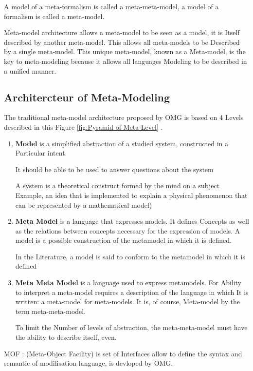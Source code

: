 A model of a meta-formalism is called a meta-meta-model, a model of a formalism is called a meta-model\cite{ch3-meta2}.

Meta-model architecture allows a meta-model to be seen as a model, it is
Itself described by another meta-model. This allows all meta-models to be
Described by a single meta-model. This unique meta-model, known as a
Meta-model, is the key to meta-modeling because it allows all languages
Modeling to be described in a unified manner.


\subsection{Architercteur of Meta-Modeling}
The traditional meta-model architecture proposed by OMG is based on 4 Levels
described in this Figure \ref{fig:Pyramid of Meta-Level} \cite{ch3-doc, ch3-mml} .

\begin{enumerate}
\item \textbf{Model} is a simplified abstraction of a studied system, constructed in a
Particular intent. 

It should be able to be used to answer questions about the system

A system is a theoretical construct formed by the mind on a subject
Example, an idea that is implemented to explain a physical phenomenon that can
be represented by a mathematical model) 

\item \textbf{Meta Model} is a language that expresses models. It defines
Concepts as well as the relations between concepts necessary for the expression of models. 
A model is a possible construction of the metamodel in which it is defined.

In the Literature, a model is said to conform to the metamodel in which it is defined

\item \textbf{Meta Meta Model} is a language used to express metamodels. 
For Ability to interpret a meta-model requires a description of the language in which
It is written: a meta-model for meta-models. 
It is, of course, Meta-model by the term meta-meta-model. 

To limit the Number of levels of abstraction, the meta-meta-model 
must have the ability to describe itself, even. 
 

\end{enumerate}

MOF : (Meta-Object Facility) is set of Interfaces allow to define 
the syntax and semantic of modilisation language, is devloped by OMG\cite{ch3-doc, ch3-doc}.

